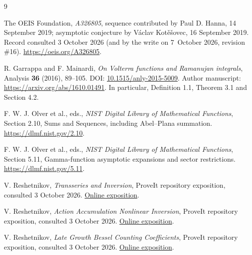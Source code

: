 \documentclass[11pt]{article}
\theoremstyle{remark}\newtheorem{remark}[theorem]{Remark}
\begin{document}
\begin{thebibliography}{9}
\small\raggedright
{}
The OEIS Foundation, \emph{A326805}, sequence contributed by Paul D. Hanna, 14 September 2019; asymptotic conjecture by V\'aclav Kot\v e\v sovec, 16 September 2019. Record consulted 3 October 2026 (and by the write on 7~October 2026, revision \#16). \url{https://oeis.org/A326805}.

R. Garrappa and F. Mainardi, \emph{On Volterra functions and Ramanujan integrals}, Analysis \textbf{36} (2016), 89--105. DOI: \href{https://doi.org/10.1515/anly-2015-5009}{10.1515/anly-2015-5009}. Author manuscript: \url{https://arxiv.org/abs/1610.01491}. In particular, Definition 1.1, Theorem 3.1 and Section 4.2.

F. W. J. Olver et al., eds., \emph{NIST Digital Library of Mathematical Functions}, Section 2.10, Sums and Sequences, including Abel--Plana summation. \url{https://dlmf.nist.gov/2.10}.

F. W. J. Olver et al., eds., \emph{NIST Digital Library of Mathematical Functions}, Section 5.11, Gamma-function asymptotic expansions and sector restrictions. \url{https://dlmf.nist.gov/5.11}.

V. Reshetnikov, \emph{Transseries and Inversion}, ProveIt repository exposition, consulted 3 October 2026. \href{https://github.com/VladimirReshetnikov/ProveIt/tree/main/Analysis/Transseries/docs/series-and-transseries/Transseries_And_Inversion}{Online exposition}.

V. Reshetnikov, \emph{Action Accumulation Nonlinear Inversion}, ProveIt repository exposition, consulted 3 October 2026. \href{https://github.com/VladimirReshetnikov/ProveIt/tree/main/Analysis/Transseries/docs/series-and-transseries/Action_Accumulation_Nonlinear_Inversion}{Online exposition}.

V. Reshetnikov, \emph{Late Growth Bessel Counting Coefficients}, ProveIt repository exposition, consulted 3 October 2026. \href{https://github.com/VladimirReshetnikov/ProveIt/tree/main/Analysis/Transseries/docs/series-and-transseries/Late_Growth_Bessel_Counting_Coefficients}{Online exposition}.
\end{thebibliography}
\end{document}
